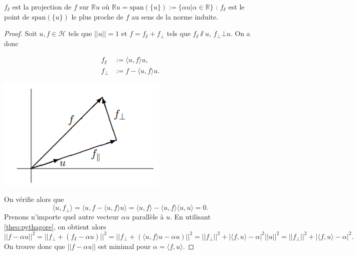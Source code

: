\begin{remark}
    $f_\sslash$ est la projection de $f$ sur $\mathbb{R}u$ où $\mathbb{R}u = \text{span}(\{u\}):= \{\alpha u | \alpha\in\mathbb{R}\}$ : $f_\sslash$ est le point de $\text{span}(\{u\})$ le plus proche de $f$ au sens de la norme induite.
\end{remark}
\begin{proof}
    Soit $u,f\in\mathcal{H}$ tels que $||u||=1$ et $f = f_{\sslash} + f_\bot$ tels que $f_{\sslash}\sslash u$, $f_\bot \bot u$. On a donc
    \begin{center}
        \begin{minipage}{0.3\textwidth}
            \begin{align*}
                f_{\sslash} &:= \langle u,f \rangle u, \\
                f_{\bot}    &:= f - \langle u,f \rangle u.
            \end{align*}
        \end{minipage}
        \begin{minipage}{0.3\textwidth}
            \centering
            \includegraphics[scale = 0.5]{synthese_projection.PNG}
        \end{minipage}
    \end{center}
    
    On vérifie alors que
    \begin{equation*}
        \langle u,f_{\bot} \rangle = \langle u,f - \langle u,f \rangle u \rangle = \langle u,f \rangle - \langle u,f \rangle \langle u,u \rangle = 0.
    \end{equation*}
    Prenons n'importe quel autre vecteur $\alpha u$ parallèle à $u$. En utilisant \ref{theo:pythagore}, on obtient alors
    \begin{equation*}
        ||f-\alpha u||^2 = ||f_\bot + (f_\sslash - \alpha u)||^2 = ||f_\bot + (\langle u,f \rangle u - \alpha u)||^2 = ||f_\bot||^2 + |\langle f,u \rangle - \alpha|^2 ||u||^2 = ||f_\bot||^2 + |\langle f,u \rangle - \alpha|^2.
    \end{equation*}
    On trouve donc que $||f-\alpha u||$ est minimal pour $\alpha = \langle f,u \rangle$.
\end{proof}

